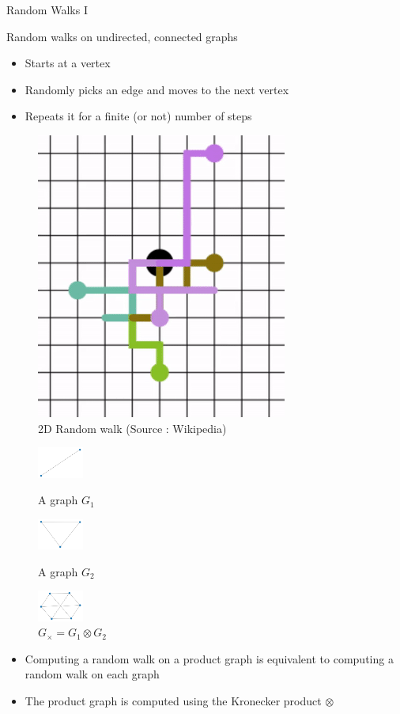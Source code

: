 \documentclass[compress]{beamer}
\begin{document}
\begin{frame}{Random Walks I}
\begin{multicols}{2}
	Random walks on undirected, connected graphs 
	\begin{itemize}
		\item Starts at a vertex
		\item Randomly picks an edge and moves to the next vertex
		\item Repeats it for a finite (or not) number of steps
	\end{itemize}
	\begin{figure}
		\includegraphics[height=.25\textheight]{data/randomwalk.png}
		\caption*{2D Random walk (Source : Wikipedia)}
	\end{figure}
\end{multicols}
\vspace*{-0.8cm}
\begin{figure}
\begin{multicols}{3}
\includegraphics[width=1.5cm]{data/prod_graph/g1.png}\caption*{A graph $G_1$}\par
\includegraphics[width=1.5cm]{data/prod_graph/g2.png}\caption*{A graph $G_2$}\par
\includegraphics[width=1.5cm]{data/prod_graph/gx.png}\caption*{$G_{\times}=G_1 \otimes G_2$}\par
\end{multicols}
\end{figure}
\begin{itemize}
	\item Computing a random walk on a product graph is equivalent to computing a random walk on each graph \citep{imrich2000product}
	\item The product graph is computed using the Kronecker product $\otimes$
\end{itemize}
\end{frame}
\end{document}
